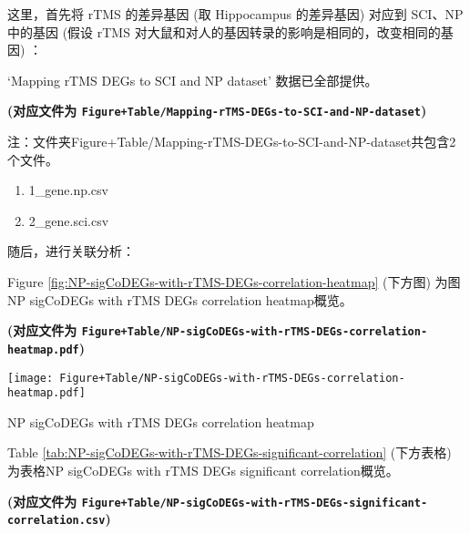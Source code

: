 \documentclass[
]{article}
\providecommand{\tightlist}{%
  \setlength{\itemsep}{0pt}\setlength{\parskip}{0pt}}
\begin{document}
这里，首先将 rTMS 的差异基因 (取 Hippocampus 的差异基因) 对应到 SCI、NP 中的基因 (假设 rTMS 对大鼠和对人的基因转录的影响是相同的，改变相同的基因) ：

`Mapping rTMS DEGs to SCI and NP dataset' 数据已全部提供。

\textbf{(对应文件为 \texttt{Figure+Table/Mapping-rTMS-DEGs-to-SCI-and-NP-dataset})}

\begin{center}\begin{tcolorbox}[colback=gray!10, colframe=gray!50, width=0.9\linewidth, arc=1mm, boxrule=0.5pt]注：文件夹Figure+Table/Mapping-rTMS-DEGs-to-SCI-and-NP-dataset共包含2个文件。

\begin{enumerate}\tightlist
\item 1\_gene.np.csv
\item 2\_gene.sci.csv
\end{enumerate}\end{tcolorbox}
\end{center}

随后，进行关联分析：

Figure \ref{fig:NP-sigCoDEGs-with-rTMS-DEGs-correlation-heatmap} (下方图) 为图NP sigCoDEGs with rTMS DEGs correlation heatmap概览。

\textbf{(对应文件为 \texttt{Figure+Table/NP-sigCoDEGs-with-rTMS-DEGs-correlation-heatmap.pdf})}

\def\@captype{figure}
\begin{center}
\texttt{[image: Figure+Table/NP-sigCoDEGs-with-rTMS-DEGs-correlation-heatmap.pdf]}
\caption{NP sigCoDEGs with rTMS DEGs correlation heatmap}\label{fig:NP-sigCoDEGs-with-rTMS-DEGs-correlation-heatmap}
\end{center}

Table \ref{tab:NP-sigCoDEGs-with-rTMS-DEGs-significant-correlation} (下方表格) 为表格NP sigCoDEGs with rTMS DEGs significant correlation概览。

\textbf{(对应文件为 \texttt{Figure+Table/NP-sigCoDEGs-with-rTMS-DEGs-significant-correlation.csv})}
\end{document}
